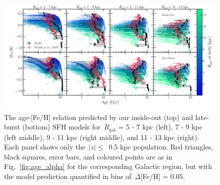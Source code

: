 \documentclass[draft2.tex]{subfiles}
\begin{document}
\begin{figure} 
\centering 
\includegraphics[scale = 0.35]{amr_insideout_vs_lateburst_fe.pdf} 
\caption{The age-[Fe/H] relation predicted by our inside-out (top) and 
late-burst (bottom) SFH models for~$R_\text{gal}$ = 5 - 7 kpc (left), 7 - 9 kpc 
(left middle), 9 - 11 kpc (right middle), and 11 - 13 kpc (right). Each panel 
shows only the~$\left|z\right|\leq$~0.5 kpc population. Red triangles, black 
squares, error bars, and coloured points are as in Fig.~\ref{fig:age_alpha} for 
the corresponding Galactic region, but with the model prediction quantified in 
bins of~$\Delta$[Fe/H] = 0.05. } 
\label{fig:amr_insideout_vs_lateburst_fe} 
\end{figure} 
\end{document}
